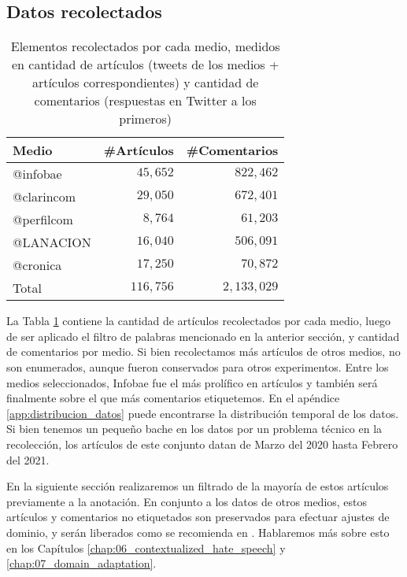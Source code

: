 \subsection{Datos recolectados}

\begin{table}[t]
    \centering
    \begin{tabular}{l rr}
    Medio      & \#Artículos & \#Comentarios \\
    \hline
    @infobae   &  $45,652$   &  $822,462$ \\
    @clarincom &  $29,050$   &  $672,401$ \\
    @perfilcom &   $8,764$   &   $61,203$  \\
    @LANACION  &  $16,040$   &  $506,091$ \\
    @cronica   &  $17,250$   &   $70,872$ \\
    \hline
    Total      & $116,756$  & $2,133,029$ \\
    \end{tabular}
    \caption{Elementos recolectados por cada medio, medidos en cantidad de artículos (tweets de los medios + artículos correspondientes) y cantidad de comentarios (respuestas en Twitter a los primeros)}
    \label{tab:articulos_recoletados_por_medio}
\end{table}


La Tabla \ref{tab:articulos_recoletados_por_medio} contiene la cantidad de artículos recolectados por cada medio, luego de ser aplicado el filtro de palabras mencionado en la anterior sección, y cantidad de comentarios por medio. Si bien recolectamos más artículos de otros medios, no son enumerados, aunque fueron conservados para otros experimentos. Entre los medios seleccionados, Infobae fue el más prolífico en artículos y también será finalmente sobre el que más comentarios etiquetemos. En el apéndice \ref{app:distribucion_datos} puede encontrarse la distribución temporal de los datos. Si bien tenemos un pequeño bache en los datos por un problema técnico en la recolección, los artículos de este conjunto datan de Marzo del 2020 hasta Febrero del 2021.

En la siguiente sección realizaremos un filtrado de la mayoría de estos artículos previamente a la anotación. En conjunto a los datos de otros medios, estos artículos y comentarios no etiquetados son preservados para efectuar ajustes de dominio, y serán liberados como se recomienda en \citet{gururangan-etal-2020-dont}. Hablaremos más sobre esto en los Capítulos \ref{chap:06_contextualized_hate_speech} y \ref{chap:07_domain_adaptation}.

